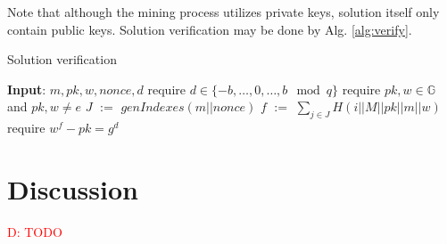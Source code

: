 \documentclass[]{article}
\newcommand{\dnote}[1]{\textcolor{red}{D: {#1}}}
\newcommand{\Name}{$Autolykos$}
\def\Let#1#2{\State #1 $:=$ #2}
\begin{document}
    Note that although the mining process utilizes private keys, solution itself
    only contain public keys. Solution verification may be done by Alg. \ref{alg:verify}.

    \begin{algorithm}[H]
        \caption{Solution verification}
        \label{alg:verify}
        \begin{algorithmic}[1]
            \State \textbf{Input}: $m,pk,w,nonce,d$
            \State require $d\in\{-b,\dots,0,\dots, b\mod q\}$
            \State require $pk,w\in \mathbb{G}$ and $pk,w \ne e$
            \Let{$J$}{$genIndexes(m||nonce)$}
            \Let{$f$}{$\sum_{j \in J} H(i||M||pk||m||w)$}
            \State require $w^f - pk = g^d$
        \end{algorithmic}
    \end{algorithm}

    \section{Discussion}

    \dnote{TODO}

\end{document}
